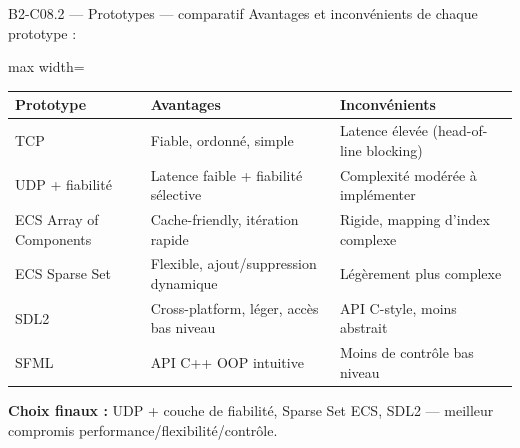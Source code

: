 \documentclass[aspectratio=169,10pt]{beamer}
\begin{document}
\begin{frame}{B2-C08.2 — Prototypes — comparatif}
\footnotesize
Avantages et inconvénients de chaque prototype :

\vspace{0.2em}
\begin{adjustbox}{max width=\textwidth}
\begin{tabular}{l p{5.5cm} p{5.5cm}}
\toprule
\textbf{Prototype} & \textbf{Avantages} & \textbf{Inconvénients} \\
\midrule
TCP                  & Fiable, ordonné, simple      & Latence élevée (head-of-line blocking) \\ \hline
UDP + fiabilité      & Latence faible + fiabilité sélective & Complexité modérée à implémenter \\ \hline
ECS Array of Components & Cache-friendly, itération rapide & Rigide, mapping d'index complexe \\ \hline
ECS Sparse Set       & Flexible, ajout/suppression dynamique & Légèrement plus complexe \\ \hline
SDL2                 & Cross-platform, léger, accès bas niveau & API C-style, moins abstrait \\ \hline
SFML                 & API C++ OOP intuitive         & Moins de contrôle bas niveau \\
\bottomrule
\end{tabular}
\end{adjustbox}

\vspace{0.3em}
\textbf{Choix finaux :} UDP + couche de fiabilité, Sparse Set ECS, SDL2 — meilleur compromis performance/flexibilité/contrôle.
\end{frame}
\end{document}
